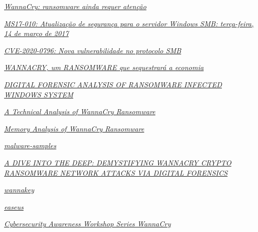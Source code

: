 \documentclass[12pt]{article}
\begin{document}
\bigskip
{}\href{https://www.convergenciadigital.com.br/Opiniao/WannaCry%3A-ransomware-ainda-requer-atencao-45352.html?UserActiveTemplate=mobile%2Csite}{\textit{WannaCry: ransomware ainda requer atenção}}

\bigskip
\noindent
[Microsoft]\href{https://support.microsoft.com/pt-br/topic/ms17-010-atualiza%C3%A7%C3%A3o-de-seguran%C3%A7a-para-o-servidor-windows-smb-ter%C3%A7a-feira-14-de-mar%C3%A7o-de-2017-435c22fb-5f9b-f0b3-3c4b-b605f4e6a655}{\textit{MS17-010: Atualização de segurança para o servidor Windows SMB: terça-feira, 14 de março de 2017}}

\bigskip
\noindent
[Kaspersky]\href{https://www.kaspersky.com.br/blog/smb-311-vulnerability/14532/}{\textit{CVE-2020-0796: Nova vulnerabilidade no protocolo SMB}}

\bigskip
{}\href{https://periciacomputacional.com/wannacry-um-ransomware-que-sequestrara-a-economia/}{\textit{WANNACRY, um RANSOMWARE que sequestrará a economia}}

\bigskip
{}\href{https://www.jetir.org/papers/JETIR1905197.pdf}{\textit{DIGITAL FORENSIC ANALYSIS OF RANSOMWARE INFECTED WINDOWS SYSTEM}}

\bigskip
{}\href{https://logrhythm.com/blog/a-technical-analysis-of-wannacry-ransomware/}{\textit{A Technical Analysis of WannaCry Ransomware}}

\bigskip
\noindent
[Donny]\href{https://www.null0x4d5a.com/2017/05/memory-analsyis-of-wannacry-ransomware.html}{\textit{Memory Analysis of WannaCry Ransomware}}

\bigskip
\noindent
[fabrimagic72]\href{https://github.com/fabrimagic72/malware-samples}{\textit{malware-samples}}

\bigskip
{}\href{http://ijits-bg.com/contents/IJITS-No2-2018/2018-N2-06.pdf}{\textit{A DIVE INTO THE DEEP: DEMYSTIFYING WANNACRY CRYPTO RANSOMWARE NETWORK ATTACKS VIA DIGITAL FORENSICS}}

\bigskip
\noindent
[aguinet]\href{https://github.com/aguinet/wannakey}{\textit{wannakey}}

\bigskip
{}\href{https://br.easeus.com/data-recovery-solution/recover-decrypt-wannacrypt-encrypted-files.html}{\textit{easeus}}

\bigskip
\noindent
[DEVCOM]\href{https://www.cs.utep.edu/CFIA/files/outreach/WannaCry/WannaCry_Exercise.pdf}{\textit{Cybersecurity Awareness Workshop Series WannaCry}}
\end{document}

